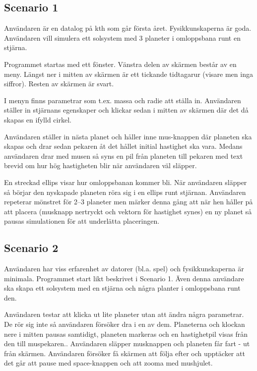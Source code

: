 
\subsection{Scenario 1}

Användaren är en datalog på kth som går första året.
Fysikkunskaperna är goda.
Användaren vill simulera ett solsystem med 3 planeter
i omloppsbana runt en stjärna.

Programmet startas med ett fönster.
Vänstra delen av skärmen består av en meny.
Längst ner i mitten av skärmen är ett tickande
tidtagarur (visare men inga siffror).
Resten av skärmen är svart.

I menyn finns parametrar som t.ex. massa och radie att ställa in.
Användaren ställer in stjärnans egenskaper och klickar
sedan i mitten av skärmen där det då skapas en ifylld cirkel.

Användaren ställer in nästa planet och håller inne mus-knappen där
planeten ska skapas och drar sedan pekaren åt det hållet initial
hastighet ska vara.
Medans användaren drar med musen så syns en pil från planeten till
pekaren med text brevid om hur hög hastigheten blir när användaren väl släpper.

En streckad ellips visar hur omloppsbanan kommer bli.
När användaren släpper så börjar den nyskapade planeten röra sig
i en ellips runt stjärnan.
Användaren repeterar mönstret för 2--3 planeter men märker denna gång
att när hen håller på att placera (musknapp nertryckt och vektorn
för hastighet synes) en ny planet så pausas simulationen för att
underlätta placeringen.

\subsection{Scenario 2}

Användaren har viss erfarenhet av datorer (bl.a. spel) och
fysikkunskaperna är minimala.
Programmet start likt beskrivet i Scenario 1.
Även denna användare ska skapa ett solsystem med en stjärna
och några planter i omloppsbana runt den.

Användaren testar att klicka ut lite planeter utan att ändra några parametrar.
De rör sig inte så användaren försöker dra i en av dem.
Planeterna och klockan nere i mitten pausas samtidigt,
planeten markeras och
en hastighetpil visas från den till muspekaren..
Användaren släpper musknappen och planeten får fart - ut från skärmen.
Användaren försöker få skärmen att följa efter och
upptäcker att det går att pause med space-knappen och
att zooma med mushjulet.

